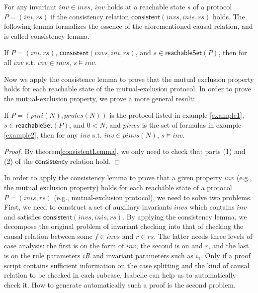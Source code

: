 \documentclass[final]{IEEEtran}
\newcommand\cai[1]{\textcolor{blue}{ #1} }
\begin{document}



For any invariant $inv \in invs$, $inv$ holds at a reachable state $s$  of a protocol $P=(ini,rs)$  if the consistency relation
$\mathsf{consistent}( invs, inis, rs)$ holds. %
The following lemma formalizes the essence of the aforementioned causal relation, and is called consistency lemma.

\begin{theorem}\label{consistentLemma}%
 If $P=(ini,rs)$, $\mathsf{consistent}( invs, ini, rs)$, and $s  \in \mathsf{reachableSet}(P)$, %
 then   for all $inv$ s.t. $inv \in invs$, $s \models inv $.
\end{theorem}



Now we apply the consistence lemma to prove that the mutual exclusion property holds for each reachable state of the mutual-exclusion protocol. %
In order to prove the mutual-exclusion property, we prove a more general result: 
\begin{lemma} \label{caseSimp}
  If $ P=(pini(N),prules(N))$ is the protocol listed in example \ref{example1},  $s \in \mathsf{reachableSet}(P)$, and $0<N$, and $pinvs$ is the set of formulas in example \ref{example2},   then for any $inv$ s.t. $inv \in pinvs(N)$, $s\models inv $.
\end{lemma}

\begin{proof} By theorem\ref{consistentLemma}, we only need
to check that parts (1) and (2) of
 the $\mathsf{consistency}$ relation  hold.  
 \end{proof}
 
In order to  apply the consistency lemma to prove that a given property $inv$ (e.g., the mutual exclusion property) holds for each reachable state of a protocol $P=(inis,rs)$ (e.g., mutual-exclusion protocol), we need to solve two problems. First, we need to construct a set of auxiliary invariants $invs$ which contains $inv$ and satisfies  $\mathsf{consistent}( invs, inis, rs)$.  By applying the consistency lemma, we  decompose the original problem of invariant checking into that of checking the causal relation between some $f\in invs$ and $r \in rs$. The latter needs three levels of case analysis: the first is on the form of $inv$, the second is on  and $r$, and the last is on the rule parameters $iR$ and invariant parameters such as $i_1$.  Only if a proof script contains sufficient information on the case splitting and  the kind of causal relation to be checked in each subcase, Isabelle can help us to automatically  check it. How to  generate automatically such a proof is the second problem.
\end{document}
